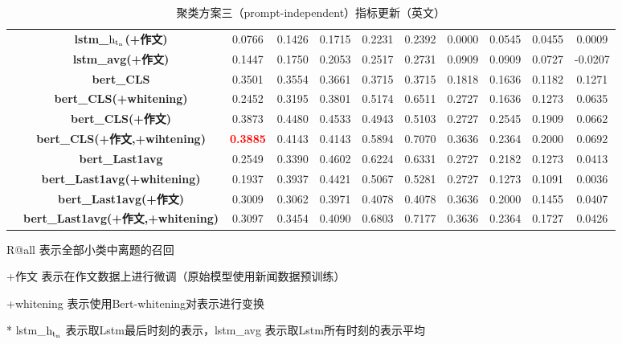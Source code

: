 \documentclass[11pt]{article}
\begin{document}
\begin{CJK}{UTF8}{gkai}
\begin{table}[hp]
{\begin{tabular}{c|c|ccccccccc}
      & \textbf{lstm\_$\rm h_{t_n}$(+作文)} & 0.0766  & 0.1426  & 0.1715  & 0.2231  & 0.2392  & 0.0000  & 0.0545  & 0.0455  & 0.0009  \\
      & \textbf{lstm\_avg(+作文)} & 0.1447  & 0.1750  & 0.2053  & 0.2517  & 0.2731  & 0.0909  & 0.0909  & 0.0727  & -0.0207  \\
      \cline{2-11}
      & \textbf{bert\_CLS} & 0.3501  & 0.3554  & 0.3661  & 0.3715  & 0.3715  & 0.1818  & 0.1636  & 0.1182  & 0.1271  \\
      & \textbf{bert\_CLS(+whitening)} & 0.2452  & 0.3195  & 0.3801  & 0.5174  & 0.6511  & 0.2727  & 0.1636  & 0.1273  & 0.0635  \\
      & \textbf{bert\_CLS(+作文)} & 0.3873  & 0.4480  & 0.4533  & 0.4943  & 0.5103  & 0.2727  & 0.2545  & 0.1909  & 0.0662  \\
      & \textbf{bert\_CLS(+作文,+wihtening)} & \textbf{\textcolor{red}{0.3885}}  & 0.4143  & 0.4143  & 0.5894  & 0.7070  & 0.3636  & 0.2364  & 0.2000  & 0.0692  \\
      \cline{2-11}
      & \textbf{bert\_Last1avg} & 0.2549  & 0.3390  & 0.4602  & 0.6224  & 0.6331  & 0.2727  & 0.2182  & 0.1273  & 0.0413  \\
      & \textbf{bert\_Last1avg(+whitening)} & 0.1937  & 0.3937  & 0.4421  & 0.5067  & 0.5281  & 0.2727  & 0.1273  & 0.1091  & 0.0036  \\
      & \textbf{bert\_Last1avg(+作文)} & 0.3009  & 0.3062  & 0.3971  & 0.4078  & 0.4078  & 0.3636  & 0.2000  & 0.1455  & 0.0407  \\
      & \textbf{bert\_Last1avg(+作文,+whitening)} & 0.3097  & 0.3454  & 0.4090  & 0.6803  & 0.7177  & 0.3636  & 0.2364  & 0.1727  & 0.0426  \\
      \hline
    \end{tabular}%
    }
    \begin{tablenotes}    %
      \footnotesize               %
      \item[1] R@all 表示全部小类中离题的召回
      \item[2] +作文 表示在作文数据上进行微调（原始模型使用新闻数据预训练） 
      \item[3] +whitening 表示使用Bert-whitening对表示进行变换
      \item[4] * lstm\_$\rm h_{t_n}$ 表示取Lstm最后时刻的表示，lstm\_avg 表示取Lstm所有时刻的表示平均
    \end{tablenotes} 
    \caption{聚类方案三（prompt-independent）指标更新（英文）}
  \label{tab:addlabel}%
\end{table}%


\end{CJK}
\end{document}
